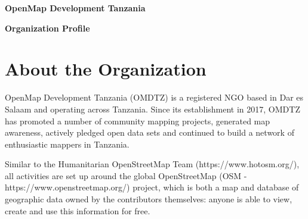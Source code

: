 \documentclass[a4paper,12pt,twoside]{article}
\begin{document}
  

\begin{center}
\vspace{5cm}
\Huge \color{OMDTZblue} \textbf {OpenMap Development Tanzania} 

\textbf{Organization Profile} 
    
\end{center}
\newpage

\newpage
\renewcommand{\baselinestretch}{1.3}\normalsize
\tableofcontents
\renewcommand{\baselinestretch}{1.0}\normalsize

\newpage
\section{About the Organization}

OpenMap Development Tanzania (OMDTZ) is a registered NGO based in Dar es Salaam and operating across Tanzania. Since its establishment in 2017, OMDTZ has promoted a number of community mapping projects, generated map awareness, actively pledged open data sets and continued to build a network of enthusiastic mappers in Tanzania. 

Similar to the Humanitarian OpenStreetMap Team (https://www.hotosm.org/), all activities are set up around the global OpenStreetMap (OSM - https://www.openstreetmap.org/) project, which is both a map and database of geographic data owned by the contributors themselves: anyone is able to view, create and use this information for free. 
\end{document}
